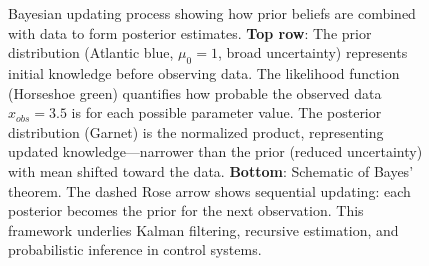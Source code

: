 \begin{figure}[htbp]
\caption{Bayesian updating process showing how prior beliefs are combined with data to form posterior estimates. \textbf{Top row}: The prior distribution (Atlantic blue, $\mu_0=1$, broad uncertainty) represents initial knowledge before observing data. The likelihood function (Horseshoe green) quantifies how probable the observed data $x_{obs}=3.5$ is for each possible parameter value. The posterior distribution (Garnet) is the normalized product, representing updated knowledge---narrower than the prior (reduced uncertainty) with mean shifted toward the data. \textbf{Bottom}: Schematic of Bayes' theorem. The dashed Rose arrow shows sequential updating: each posterior becomes the prior for the next observation. This framework underlies Kalman filtering, recursive estimation, and probabilistic inference in control systems.}
\label{fig:bayes_update}
\end{figure}
